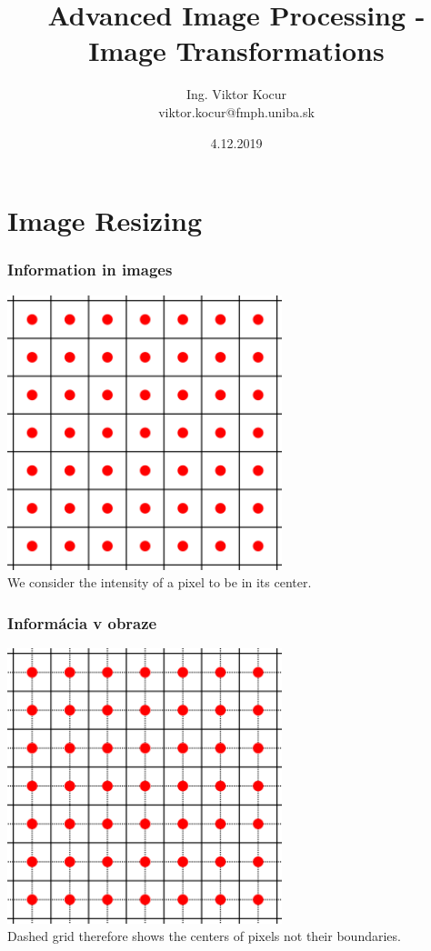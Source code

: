 \documentclass{beamer}
\title[11. cvičenie]{Advanced Image Processing - Image Transformations}
\author[Kocur]{Ing. Viktor Kocur \\{\small viktor.kocur@fmph.uniba.sk}}
\institute{DAI FMFI UK}
\date{4.12.2019}
\begin{document}

\begin{frame}

  \titlepage

\end{frame}

\section{Image Resizing}


\begin{frame}
\frametitle{Information in images}
\centering
\includegraphics[width=0.6\textwidth]{resize1.png}\\

We consider the intensity of a pixel to be in its center.
\end{frame}


\begin{frame}
\frametitle{Informácia v obraze}
\centering
\includegraphics[width=0.6\textwidth]{resize2.png} \\

Dashed grid therefore shows the centers of pixels not their boundaries.
\end{frame}
\end{document}
